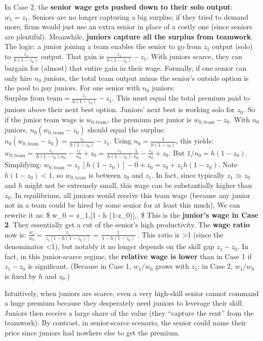 \documentclass[12pt]{article}
\begin{document}
\begin{itemize}
  In Case 2, the \textbf{senior wage gets pushed down to their solo
  output}: \(w_1 = z_1.\) Seniors are no longer capturing a big surplus;
  if they tried to demand more, firms would just use an extra senior in
  place of a costly one (since seniors are plentiful). Meanwhile,
  \textbf{juniors capture all the surplus from teamwork}. The logic: a
  junior joining a team enables the senior to go from \(z_1\) output
  (solo) to \(\frac{z_1}{h(1-z_0)}\) output. That gain is
  \(\frac{z_1}{h(1-z_0)} - z_1\). With juniors scarce, they can bargain
  for (almost) that entire gain in their wage. Formally, if one senior
  can only hire \(n_0\) juniors, the total team output minus the
  senior's outside option is the pool to pay juniors. For one senior
  with \(n_0\) juniors:
  \(\text{Surplus from team} = \frac{z_1}{h(1-z_0)} - z_1.\) This must
  equal the total premium paid to juniors above their next best option.
  Juniors' next best is working solo for \(z_0\). So if the junior team
  wage is \(w_{0,\text{team}}\), the premium per junior is
  \(w_{0,\text{team}} - z_0\). With \(n_0\) juniors,
  \(n_0 (w_{0,\text{team}} - z_0)\) should equal the surplus:
  \(n_0 (w_{0,\text{team}} - z_0) = \frac{z_1}{h(1-z_0)} - z_1.\) Using
  \(n_0 = \frac{1}{h(1-z_0)}\), this yields:
  \(w_{0,\text{team}} = \frac{z_1}{\,h(1-z_0) n_0\,} - \frac{z_1}{n_0} + z_0 = \frac{z_1}{\,h(1-z_0)\,} \frac{1}{n_0} - \frac{z_1}{n_0} + z_0.\)
  But \(1/n_0 = h(1-z_0)\). Simplifying:
  \(w_{0,\text{team}} = z_1\, [h(1-z_0)] - 0 + z_0 = z_0 + z_1 h(1-z_0).\)
  Note \(h(1-z_0) < 1\), so \(w_{0,\text{team}}\) is between \(z_0\) and
  \(z_1\). In fact, since typically \(z_1 \gg z_0\) and \(h\) might not
  be extremely small, this wage can be substantially higher than
  \(z_0\). In equilibrium, all juniors would receive this team wage
  (because any junior not in a team could be hired by some senior for at
  least this much). We can rewrite it as: \$ w\_0 = z\_1,{[}1 - h
  (1-z\_0){]},. \$ This is the \textbf{junior's wage in Case 2}.
  They essentially get a cut of the senior's high productivity. The
  \textbf{wage ratio} now is:
  \(\frac{w_1}{w_0} = \frac{z_1}{\,z_1[1 - h(1-z_0)]\,} = \frac{1}{\,1 - h(1-z_0)\,}\,.\)
  This ratio is \textgreater1 (since the denominator \textless1), but
  notably it no longer depends on the skill gap \(z_1 - z_0\). In fact,
  in this junior-scarce regime, the \textbf{relative wage is lower} than
  in Case 1 if \(z_1 - z_0\) is significant. (Because in Case 1,
  \(w_1/w_0\) grows with \(z_1\); in Case 2, \(w_1/w_0\) is fixed by
  \(h\) and \(z_0\).)

  Intuitively, when juniors are scarce, even a very high-skill senior
  cannot command a huge premium because they desperately need juniors to
  leverage their skill. Juniors then receive a large share of the value
  (they ``capture the rent'' from the teamwork). By contrast, in
  senior-scarce scenario, the senior could name their price since
  juniors had nowhere else to get the premium.
\end{itemize}
\end{document}
